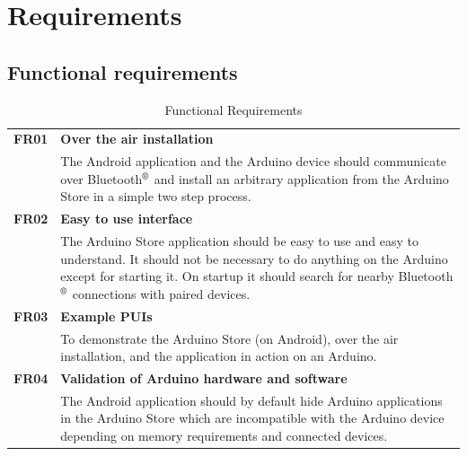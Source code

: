 \chapter{Requirements}
\section{Functional requirements}
\begin{table}[H]
\begin{tabularx}{\linewidth}{lX}
\textbf{FR01} & \textbf{Over the air installation}\\
 & The Android application and the Arduino device should communicate over Bluetooth$\textsuperscript{\textregistered}$  and install an arbitrary application from the Arduino Store in a simple two step process.\\
\textbf{FR02} & \textbf{Easy to use interface}\\
 & The Arduino Store application should be easy to use and easy to understand. It should not be necessary to do anything on the Arduino except for starting it. On startup it should search for nearby Bluetooth$\textsuperscript{\textregistered}$  connections with paired devices.\\
 \textbf{FR03} & \textbf{Example PUIs}\\
 & To demonstrate the Arduino Store (on Android), over the air installation, and the application in action on an Arduino.\\
\textbf{FR04} & \textbf{Validation of Arduino hardware and software}\\
 & The Android application should by default hide Arduino applications in the Arduino Store which are incompatible with the Arduino device depending on memory requirements and connected devices.\\
\end{tabularx}
\caption{Functional Requirements}
\end{table}

